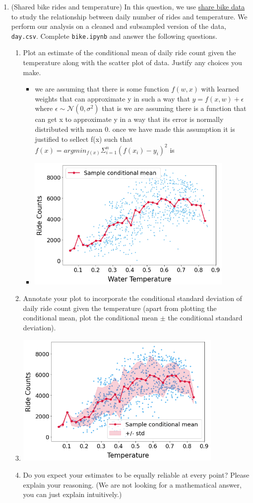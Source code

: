\documentclass[12pt,twoside]{article}
\begin{document}
\begin{enumerate}
\item (Shared bike rides and temperature) 
In this question, we use \href{https://ride.capitalbikeshare.com/system-data}{share bike data} to study the relationship between daily number of rides and temperature. We perform our analysis on a cleaned and subsampled version of the data, \texttt{day.csv}. Complete \texttt{bike.ipynb} and answer the following questions.
\begin{enumerate}
\item Plot an estimate of the conditional mean of daily ride count given the temperature along with the scatter plot of data. Justify any choices you make.
\begin{itemize}
    \item we are assuming that there is some function $f(w,x)$ with learned weights that can approximate y in such a way that $y=f(x,w)+\epsilon$ where $\epsilon\sim \mathcal{N}(0,\sigma^2) $ that is we are assuming there is a function that can get x to approximate y in a way that its error is normally distributed with mean 0. once we have made this assumption it is justified to sellect f(x) such that $f(x)=argmin_{f(x)}\Sigma_{i=1}^{n}(f(x_i)-y_i)^2$ is 
    \item \includegraphics[width=10cm]{homework 10/CHART_2.png}
\end{itemize}
\item Annotate your plot to incorporate the conditional standard deviation of daily ride count given the temperature (apart from plotting the conditional mean, plot the conditional mean $\pm$ the conditional standard deviation).
\item \includegraphics[width=10cm]{homework 10/CHART_1.png}
\item Do you expect your estimates to be equally reliable at every point? Please explain your reasoning. (We are not looking for a mathematical answer, you can just explain intuitively.)


\end{enumerate}
\end{enumerate}
\end{document}

